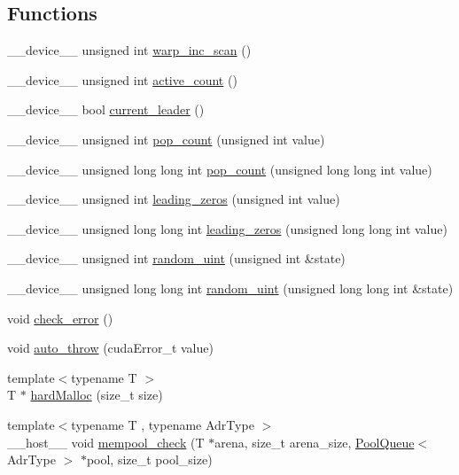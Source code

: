 \subsection*{Functions}
\begin{DoxyCompactItemize}
\item 
\-\_\-\-\_\-device\-\_\-\-\_\- unsigned int \hyperlink{namespaceutil_ade1806c455fa4b9a324d7a58287292a1}{warp\-\_\-inc\-\_\-scan} ()
\item 
\-\_\-\-\_\-device\-\_\-\-\_\- unsigned int \hyperlink{namespaceutil_acdc4ce75cc30ffc44231c225619f84cd}{active\-\_\-count} ()
\item 
\-\_\-\-\_\-device\-\_\-\-\_\- bool \hyperlink{namespaceutil_a2a8d186fee07e05266ab6c4192cd05be}{current\-\_\-leader} ()
\item 
\-\_\-\-\_\-device\-\_\-\-\_\- unsigned int \hyperlink{namespaceutil_aef6b31de423367b022ef144792dd3871}{pop\-\_\-count} (unsigned int value)
\item 
\-\_\-\-\_\-device\-\_\-\-\_\- unsigned long long int \hyperlink{namespaceutil_a5c7cfa404836c3c12af9c0cac7227725}{pop\-\_\-count} (unsigned long long int value)
\item 
\-\_\-\-\_\-device\-\_\-\-\_\- unsigned int \hyperlink{namespaceutil_a375457e64d99ed17143820fb77310d53}{leading\-\_\-zeros} (unsigned int value)
\item 
\-\_\-\-\_\-device\-\_\-\-\_\- unsigned long long int \hyperlink{namespaceutil_a033960422b1db2cd335f68194168422a}{leading\-\_\-zeros} (unsigned long long int value)
\item 
\-\_\-\-\_\-device\-\_\-\-\_\- unsigned int \hyperlink{namespaceutil_adddacee5815c17a42b0dcda544281172}{random\-\_\-uint} (unsigned int \&state)
\item 
\-\_\-\-\_\-device\-\_\-\-\_\- unsigned long long int \hyperlink{namespaceutil_a0b7eca25b91db4d222ef780a732666a7}{random\-\_\-uint} (unsigned long long int \&state)
\item 
void \hyperlink{namespaceutil_ada90753d05f83ef24d75e57ebf7e2c66}{check\-\_\-error} ()
\item 
void \hyperlink{namespaceutil_a51e7342a147704ad3d5a600ba324344f}{auto\-\_\-throw} (cuda\-Error\-\_\-t value)
\item 
{\footnotesize template$<$typename T $>$ }\\T $\ast$ \hyperlink{namespaceutil_a771b035a2a95fc229f5a0744e32a8780}{hard\-Malloc} (size\-\_\-t size)
\item 
{\footnotesize template$<$typename T , typename Adr\-Type $>$ }\\\-\_\-\-\_\-host\-\_\-\-\_\- void \hyperlink{namespaceutil_afd3b79b95d9621c95e417f3f292861de}{mempool\-\_\-check} (T $\ast$arena, size\-\_\-t arena\-\_\-size, \hyperlink{structutil_1_1PoolQueue}{Pool\-Queue}$<$ Adr\-Type $>$ $\ast$pool, size\-\_\-t pool\-\_\-size)

\end{DoxyCompactItemize}
